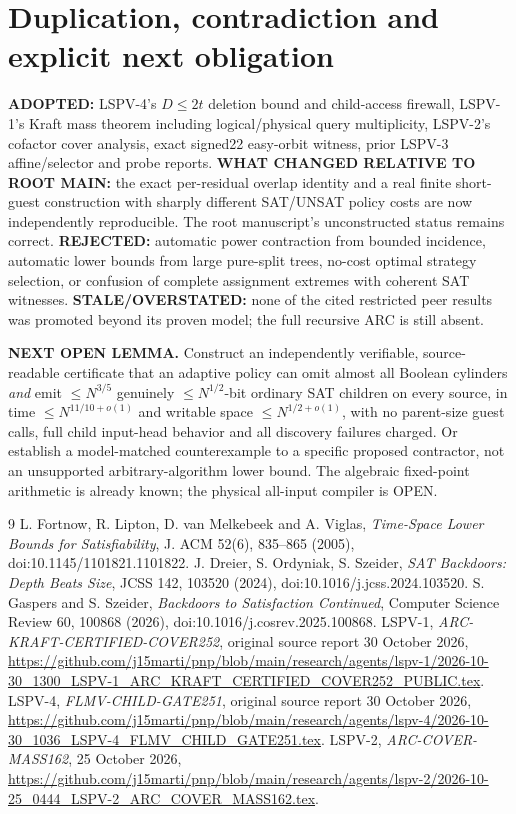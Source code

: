 \documentclass[10pt]{article}
\begin{document}
\section{Duplication, contradiction and explicit next obligation}
\textbf{ADOPTED:} LSPV-4's $D\le2t$ deletion bound and child-access firewall, LSPV-1's Kraft mass theorem including logical/physical query multiplicity, LSPV-2's cofactor cover analysis, exact signed22 easy-orbit witness, prior LSPV-3 affine/selector and probe reports. \textbf{WHAT CHANGED RELATIVE TO ROOT MAIN:} the exact per-residual overlap identity and a real finite short-guest construction with sharply different SAT/UNSAT policy costs are now independently reproducible. The root manuscript's unconstructed status remains correct. \textbf{REJECTED:} automatic power contraction from bounded incidence, automatic lower bounds from large pure-split trees, no-cost optimal strategy selection, or confusion of complete assignment extremes with coherent SAT witnesses. \textbf{STALE/OVERSTATED:} none of the cited restricted peer results was promoted beyond its proven model; the full recursive ARC is still absent.

\textbf{NEXT OPEN LEMMA.} Construct an independently verifiable, source-readable certificate that an adaptive policy can omit almost all Boolean cylinders \emph{and} emit $\le N^{3/5}$ genuinely $\le N^{1/2}$-bit ordinary SAT children on every source, in time $\le N^{11/10+o(1)}$ and writable space $\le N^{1/2+o(1)}$, with no parent-size guest calls, full child input-head behavior and all discovery failures charged. Or establish a model-matched counterexample to a specific proposed contractor, not an unsupported arbitrary-algorithm lower bound. The algebraic fixed-point arithmetic is already known; the physical all-input compiler is OPEN.

\begin{thebibliography}{9}
 L. Fortnow, R. Lipton, D. van Melkebeek and A. Viglas, \emph{Time-Space Lower Bounds for Satisfiability}, J. ACM 52(6), 835--865 (2005), doi:10.1145/1101821.1101822.
 J. Dreier, S. Ordyniak, S. Szeider, \emph{SAT Backdoors: Depth Beats Size}, JCSS 142, 103520 (2024), doi:10.1016/j.jcss.2024.103520.
 S. Gaspers and S. Szeider, \emph{Backdoors to Satisfaction Continued}, Computer Science Review 60, 100868 (2026), doi:10.1016/j.cosrev.2025.100868.
 LSPV-1, \emph{ARC-KRAFT-CERTIFIED-COVER252}, original source report 30 October 2026, \url{https://github.com/j15marti/pnp/blob/main/research/agents/lspv-1/2026-10-30_1300_LSPV-1_ARC_KRAFT_CERTIFIED_COVER252_PUBLIC.tex}.
 LSPV-4, \emph{FLMV-CHILD-GATE251}, original source report 30 October 2026, \url{https://github.com/j15marti/pnp/blob/main/research/agents/lspv-4/2026-10-30_1036_LSPV-4_FLMV_CHILD_GATE251.tex}.
 LSPV-2, \emph{ARC-COVER-MASS162}, 25 October 2026, \url{https://github.com/j15marti/pnp/blob/main/research/agents/lspv-2/2026-10-25_0444_LSPV-2_ARC_COVER_MASS162.tex}.
\end{thebibliography}
\end{document}
